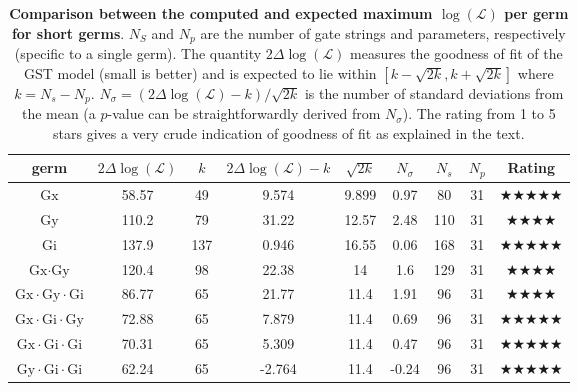 \documentclass{article}[11pt]
\begin{document}
{\begin{table}[h]
\begin{center}
\begin{tabular}[l]{|c|c|c|c|c|c|c|c|c|}
\hline
germ & $2\Delta\log(\mathcal{L})$ & $k$ & $2\Delta\log(\mathcal{L})-k$ & $\sqrt{2k}$ & $N_\sigma$ & $N_s$ & $N_p$ & Rating \\ \hline
$\mbox{Gx}$ & 58.57 & 49 & 9.574 & 9.899 & 0.97 & 80 & 31 & $\bigstar\bigstar\bigstar\bigstar\bigstar$ \\ \hline
$\mbox{Gy}$ & 110.2 & 79 & 31.22 & 12.57 & 2.48 & 110 & 31 & $\bigstar\bigstar\bigstar\bigstar$ \\ \hline
$\mbox{Gi}$ & 137.9 & 137 & 0.946 & 16.55 & 0.06 & 168 & 31 & $\bigstar\bigstar\bigstar\bigstar\bigstar$ \\ \hline
$\mbox{Gx}\cdot\mbox{Gy}$ & 120.4 & 98 & 22.38 & 14 & 1.6 & 129 & 31 & $\bigstar\bigstar\bigstar\bigstar$ \\ \hline
$\mbox{Gx}\cdot\mbox{Gy}\cdot\mbox{Gi}$ & 86.77 & 65 & 21.77 & 11.4 & 1.91 & 96 & 31 & $\bigstar\bigstar\bigstar\bigstar$ \\ \hline
$\mbox{Gx}\cdot\mbox{Gi}\cdot\mbox{Gy}$ & 72.88 & 65 & 7.879 & 11.4 & 0.69 & 96 & 31 & $\bigstar\bigstar\bigstar\bigstar\bigstar$ \\ \hline
$\mbox{Gx}\cdot\mbox{Gi}\cdot\mbox{Gi}$ & 70.31 & 65 & 5.309 & 11.4 & 0.47 & 96 & 31 & $\bigstar\bigstar\bigstar\bigstar\bigstar$ \\ \hline
$\mbox{Gy}\cdot\mbox{Gi}\cdot\mbox{Gi}$ & 62.24 & 65 & -2.764 & 11.4 & -0.24 & 96 & 31 & $\bigstar\bigstar\bigstar\bigstar\bigstar$ \\ \hline
\end{tabular}

\caption{\textbf{Comparison between the computed and expected maximum $\log(\mathcal{L})$ per germ for short germs}.  $N_S$ and $N_p$ are the number of gate strings and parameters, respectively (specific to a single germ).  The quantity $2\Delta\log(\mathcal{L})$ measures the goodness of fit of the GST model (small is better) and is expected to lie within $[k-\sqrt{2k},k+\sqrt{2k}]$ where $k = N_s-N_p$. $N_\sigma = (2\Delta\log(\mathcal{L})-k)/\sqrt{2k}$ is the number of standard deviations from the mean (a $p$-value can be straightforwardly derived from $N_\sigma$).  The rating from 1 to 5 stars gives a very crude indication of goodness of fit as explained in the text.\label{FitByGermTable}}
\end{center}
\end{table}


}
\end{document}
